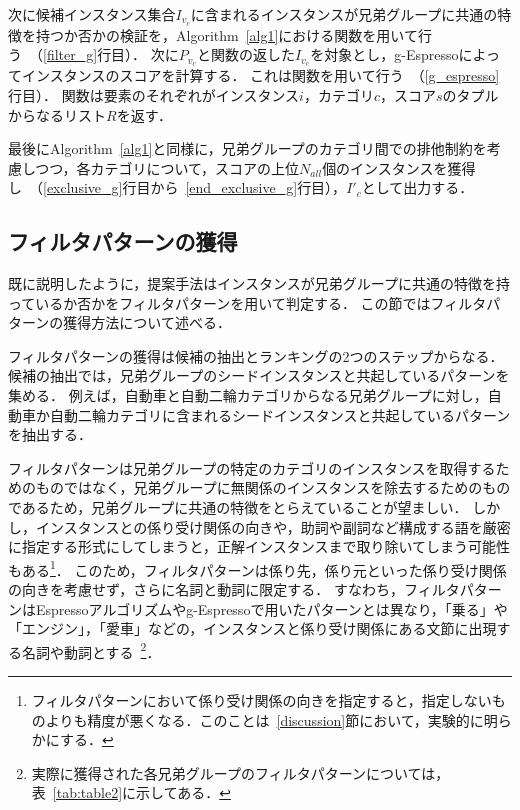 \documentclass[japanese]{jnlp_1.4}
\begin{document}
次に候補インスタンス集合$I_{v_{c}}$に含まれるインスタンスが兄弟グループに共通の特徴を持つか否かの検証を，Algorithm~\ref{alg1}における関数を用いて行う~（\ref{filter_g}行目）．
次に$P_{v_{c}}$と関数の返した$I_{v_{c}}$を対象とし，g-Espressoによってインスタンスのスコアを計算する．
これは関数を用いて行う~（\ref{g_espresso}行目）．
関数は要素のそれぞれがインスタンス$i$，カテゴリ$c$，スコア$s$のタプルからなるリスト$R$を返す．

最後にAlgorithm~\ref{alg1}と同様に，兄弟グループのカテゴリ間での排他制約を考慮しつつ，各カテゴリについて，スコアの上位$N_{all}$個のインスタンスを獲得し~（\ref{exclusive_g}行目から~\ref{end_exclusive_g}行目），$I'_{c}$として出力する．



\subsection{フィルタパターンの獲得}

既に説明したように，提案手法はインスタンスが兄弟グループに共通の特徴を持っているか否かをフィルタパターンを用いて判定する．
この節ではフィルタパターンの獲得方法について述べる．

フィルタパターンの獲得は候補の抽出とランキングの2つのステップからなる．
候補の抽出では，兄弟グループのシードインスタンスと共起しているパターンを集める．
例えば，自動車と自動二輪カテゴリからなる兄弟グループに対し，自動車か自動二輪カテゴリに含まれるシードインスタンスと共起しているパターンを抽出する．


フィルタパターンは兄弟グループの特定のカテゴリのインスタンスを取得するためのものではなく，兄弟グループに無関係のインスタンスを除去するためのものであるため，兄弟グループに共通の特徴をとらえていることが望ましい．
しかし，インスタンスとの係り受け関係の向きや，助詞や副詞など構成する語を厳密に指定する形式にしてしまうと，正解インスタンスまで取り除いてしまう可能性もある\footnote{フィルタパターンにおいて係り受け関係の向きを指定すると，指定しないものよりも精度が悪くなる．このことは~\ref{discussion}節において，実験的に明らかにする．}．
このため，フィルタパターンは係り先，係り元といった係り受け関係の向きを考慮せず，さらに名詞と動詞に限定する．
すなわち，フィルタパターンはEspressoアルゴリズムやg-Espressoで用いたパターンとは異なり，「乗る」や「エンジン」，「愛車」などの，インスタンスと係り受け関係にある文節に出現する名詞や動詞とする~\footnote{実際に獲得された各兄弟グループのフィルタパターンについては，表~\ref{tab:table2}に示してある．}．
\end{document}
